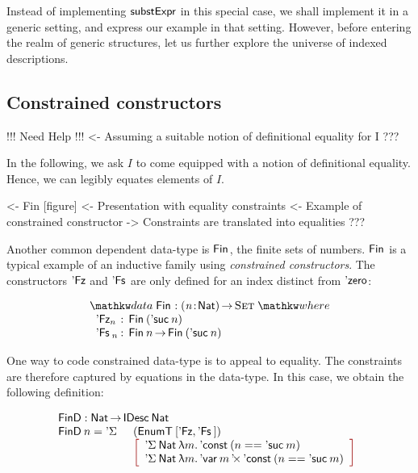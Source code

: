 Instead of implementing $\substH$ in this special case, we shall
implement it in a generic setting, and express our example in that
setting. However, before entering the realm of generic structures, let
us further explore the universe of indexed descriptions.

\subsection{Constrained constructors}

\begin{wstructure}
!!! Need Help !!!
<- Assuming a suitable notion of definitional equality for I
    ???
\end{wstructure}

In the following, we ask $I$ to come equipped with a notion of
definitional equality. Hence, we can legibly equates elements of $I$.


\begin{wstructure}
<- Fin [figure]
    <- Presentation with equality constraints
    <- Example of constrained constructor
        -> Constraints are translated into equalities
    ???
\end{wstructure}
 
Another common dependent data-type is $\Fin{\!}$, the finite sets of
numbers. $\Fin{\!}$ is a typical example of an inductive family using
\emph{constrained constructors}. The constructors $\FinZero$ and
$\FinSuc{\!}$ are only defined for an index distinct from $\NatZero$:


\[
\stk{
\data \Fin{\!} : \PI{\V{n}}{\Nat} \Set \where \\
\;\;\begin{array}{@{}l@{\::\:\:}l@{\quad}l}
    \FinZero_n      & \Fin{(\NatSuc{n})}   \\
    \FinSuc{}_n     & \Fin{n} \To \Fin{(\NatSuc{n})}
\end{array}
}
\]

One way to code constrained data-type is to appeal to equality. The
constraints are therefore captured by equations in the data-type. In
this case, we obtain the following definition:

\[\stk{
\FinD : \Nat \To \IDesc{\Nat} \\
\begin{array}{@{}ll}
\FinD\: n = \DSigma{}{} & (\EnumT{[ \FinZero , \FinSuc{} ]}) \\
                        & \bigRedBracket{
                          \begin{array}{l}
                            \DSigma{\Nat}{\LAM{m} \DConst{(n \PropEq \NatSuc{m})}} \\
                            \DSigma{\Nat}{\LAM{m} \DProd{\DVar{m}}{\DConst{(n \PropEq \NatSuc{m})}}}
                          \end{array}
                          }
\end{array}
}\]

